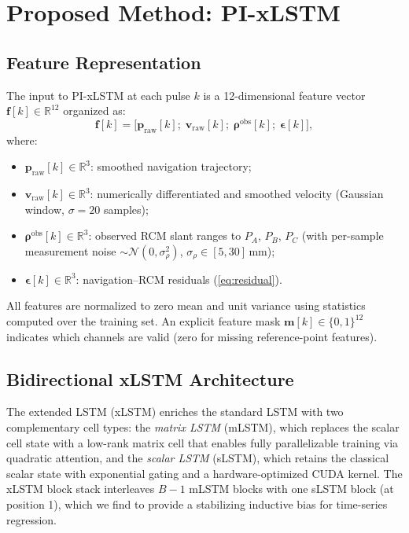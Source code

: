 \documentclass[conference]{IEEEtran}
\newcommand{\vp}{\mathbf{p}}
\begin{document}
\section{Proposed Method: PI-xLSTM}
\label{sec:method}

\subsection{Feature Representation}
\label{sec:features}

The input to PI-xLSTM at each pulse $k$ is a 12-dimensional feature vector
$\mathbf{f}[k] \in \mathbb{R}^{12}$ organized as:
\begin{equation}
  \mathbf{f}[k] =
  \bigl[\vp_{\text{raw}}[k];\; \mathbf{v}_{\text{raw}}[k];\;
        \bm{\rho}^{\text{obs}}[k];\; \bm{\epsilon}[k] \bigr],
  \label{eq:feature}
\end{equation}
where:
\begin{itemize}
  \item $\vp_{\text{raw}}[k] \in \mathbb{R}^{3}$: smoothed navigation trajectory;
  \item $\mathbf{v}_{\text{raw}}[k] \in \mathbb{R}^{3}$: numerically differentiated
        and smoothed velocity (Gaussian window, $\sigma{=}20$ samples);
  \item $\bm{\rho}^{\text{obs}}[k] \in \mathbb{R}^{3}$: observed RCM slant ranges
        to $P_A$, $P_B$, $P_C$ (with per-sample measurement noise $\sim\mathcal{N}(0,\sigma_\rho^2)$,
        $\sigma_\rho \in [5,30]$\,mm);
  \item $\bm{\epsilon}[k] \in \mathbb{R}^{3}$: navigation–RCM residuals (\ref{eq:residual}).
\end{itemize}
All features are normalized to zero mean and unit variance using statistics
computed over the training set.
An explicit feature mask $\mathbf{m}[k] \in \{0,1\}^{12}$ indicates which
channels are valid (zero for missing reference-point features).

\subsection{Bidirectional xLSTM Architecture}
\label{sec:arch}

The extended LSTM (xLSTM) \cite{beck2024xlstm} enriches the standard LSTM
with two complementary cell types:
the \emph{matrix LSTM} (mLSTM), which replaces the scalar cell state with
a low-rank matrix cell that enables fully parallelizable training via
quadratic attention, and the
\emph{scalar LSTM} (sLSTM), which retains the classical scalar state with
exponential gating and a hardware-optimized CUDA kernel.
The xLSTM block stack interleaves $B{-}1$ mLSTM blocks with one sLSTM block
(at position 1), which we find to provide a stabilizing inductive bias for
time-series regression.
\end{document}
